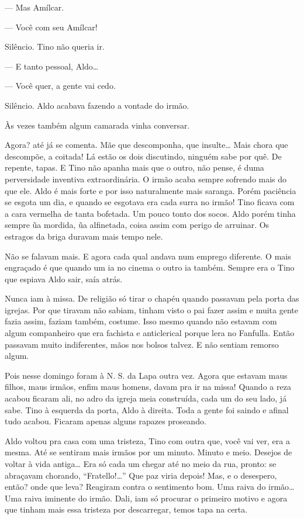 \begin{linenumbers}
--- Mas Amílcar.

--- Você com seu Amílcar!

Silêncio. Tino não queria ir.

--- E tanto pessoal, Aldo\ldots{}

--- Você quer, a gente vai cedo.

Silêncio. Aldo acabava fazendo a vontade do irmão.

Às vezes também algum camarada vinha conversar. 

Agora? até já se comenta. Mãe que descomponha, que insulte\ldots{} Mais chora
que descompõe, a coitada! Lá estão os dois discutindo, ninguém sabe por
quê. De repente, tapas. E Tino não apanha mais que o outro, não pense, é
duma perversidade inventiva extraordinária. O irmão acaba sempre
sofrendo mais do que ele. Aldo é mais forte e por isso naturalmente mais
saranga. Porém paciência se esgota um dia, e quando se esgotava era cada
surra no irmão! Tino ficava com a cara vermelha de tanta bofetada. Um
pouco tonto dos socos. Aldo porém tinha sempre ũa mordida, ũa
alfinetada, coisa assim com perigo de arruinar. Os estragos da briga
duravam mais tempo nele.

Não se falavam mais. E agora cada qual andava num emprego diferente. O
mais engraçado é que quando um ia no cinema o outro ia também. Sempre
era o Tino que espiava Aldo sair, saía atrás.

Nunca iam à missa. De religião só tirar o chapéu quando passavam pela
porta das igrejas. Por que tiravam não sabiam, tinham visto o pai fazer
assim e muita gente fazia assim, faziam também, costume. Isso mesmo
quando não estavam com algum companheiro que era fachista e anticlerical
porque lera no Fanfulla. Então passavam muito indiferentes, mãos nos
bolsos talvez. E não sentiam remorso algum.

Pois nesse domingo foram à N. S. da Lapa outra vez. Agora que estavam
maus filhos, maus irmãos, enfim maus homens, davam pra ir na missa!
Quando a reza acabou ficaram ali, no adro da igreja meia construída,
cada um do seu lado, já sabe. Tino à esquerda da porta, Aldo à direita.
Toda a gente foi saindo e afinal tudo acabou. Ficaram apenas alguns
rapazes proseando.

Aldo voltou pra casa com uma tristeza, Tino com outra que, você vai ver,
era a mesma. Até se sentiram mais irmãos por um minuto. Minuto e meio.
Desejos de voltar à vida antiga\ldots{} Era só cada um chegar até no meio da
rua, pronto: se abraçavam chorando, ``Fratello!\ldots{}'' Que paz viria
depois! Mas, e o desespero, então? onde que leva? Reagiram contra o
sentimento bom. Uma raiva do irmão\ldots{} Uma raiva iminente do irmão. Dali,
iam só procurar o primeiro motivo e agora que tinham mais essa tristeza
por descarregar, temos tapa na certa.


\end{linenumbers}
